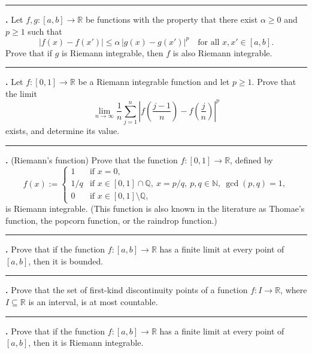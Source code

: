\documentclass[11pt]{article}
\newcounter{probnum}
\newenvironment{problembox}{\par\noindent\rule{\linewidth}{0.5pt}\vspace{5pt}\par}{\vspace{2pt}}
\begin{document}
\begin{problembox}
\textbf{\theprobnum.} Let $f,g : [a,b] \to \mathbb{R}$ be functions with the property that there exist $\alpha \ge 0$ and $p \ge 1$ such that
\[
|f(x) - f(x')| \le \alpha\, |g(x) - g(x')|^p \quad \text{for all } x, x' \in [a,b].
\]
Prove that if $g$ is Riemann integrable, then $f$ is also Riemann integrable.
\end{problembox}

\begin{problembox}
\textbf{\theprobnum.} Let $f : [0,1] \to \mathbb{R}$ be a Riemann integrable function and let $p \ge 1$. Prove that the limit
\[
\lim_{n \to \infty} \frac{1}{n} \sum_{j=1}^{n} \left| f\left(\frac{j-1}{n}\right) - f\left(\frac{j}{n}\right) \right|^p
\]
exists, and determine its value.
\end{problembox}

\begin{problembox}
\textbf{\theprobnum.} (Riemann's function) Prove that the function $f : [0,1] \to \mathbb{R}$, defined by
\[
f(x) := \begin{cases} 1 & \text{if } x = 0, \\ 1/q & \text{if } x \in [0,1] \cap \mathbb{Q},\ x = p/q,\ p,q \in \mathbb{N},\ \gcd(p,q)=1, \\ 0 & \text{if } x \in [0,1] \setminus \mathbb{Q}, \end{cases}
\]
is Riemann integrable. (This function is also known in the literature as Thomae's function, the popcorn function, or the raindrop function.)
\end{problembox}

\begin{problembox}
\textbf{\theprobnum.} Prove that if the function $f : [a,b] \to \mathbb{R}$ has a finite limit at every point of $[a,b]$, then it is bounded.
\end{problembox}

\begin{problembox}
\textbf{\theprobnum.} Prove that the set of first-kind discontinuity points of a function $f : I \to \mathbb{R}$, where $I \subseteq \mathbb{R}$ is an interval, is at most countable.
\end{problembox}

\begin{problembox}
\textbf{\theprobnum.} Prove that if the function $f : [a,b] \to \mathbb{R}$ has a finite limit at every point of $[a,b]$, then it is Riemann integrable.
\end{problembox}
\end{document}
